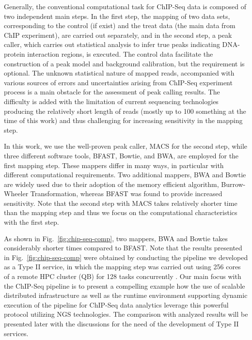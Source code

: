 \documentclass{cpeauth}
\begin{document}
 Generally, the conventional computational task for ChIP-Seq data is composed of two
 independent main steps\cite{pepke2009}.  In the first step,
 the mapping of two data sets, corresponding to the control (if exist) and the
 treat data (the main data from ChIP experiment), are carried out separately, and in the second step, a
 peak caller, which carries out statistical analysis to infer true
 peaks indicating DNA-protein interaction regions, is executed.  The
 control data facilitate the construction of a peak model and
 background calibration, but the requirement is optional.  The unknown statistical
 nature of mapped reads, accompanied with various sources of errors and uncertainties arising from ChIP-Seq
 experiment process is a main obstacle for the assessment of peak calling results.  The difficulty is added with the limitation of current sequencing technologies producing the relatively short length of reads
 (mostly up to 100 something at the time of this work) and thus challenging for increasing
 sensitivity in the mapping step\cite{pepke2009,laajala,wilbanks}.
 
 In this work, we use the well-proven peak caller, MACS\cite{macs} for
 the second step, while three different software tools, BFAST, Bowtie,
 and BWA, are employed for the first mapping step.  These mappers
 differ in many ways, in particular with different computational
 requirements.  Two additional mappers, BWA and Bowtie are widely used
 due to their adoption of the memory efficient algorithm,
 Burrow-Wheeler Transformation, whereas BFAST was found to provide
 increased sensitivity\cite{bfast2009,mapping-survey}.  Note that the second step with MACS takes relatively shorter time than the mapping step and thus we focus on the computational characteristics with the first step.  
 
 As shown in Fig.~\ref{fig:chip-seq-comp}, two mappers, BWA and Bowtie takes
 considerably shorter times compared to BFAST.  Note that the results
 presented in Fig.~\ref{fig:chip-seq-comp} were obtained by conducting
 the pipeline we developed as a Type II service, in which the mapping step was carried out using
 256 cores of a remote HPC cluster (QB) for 128 tasks concurrently .  Our main focus with the
 ChIP-Seq pipeline is to present a compelling example how the use of
 scalable distributed infrastructure as well as the runtime
 environment supporting dynamic execution of the pipeline for ChIP-Seq
 data analytics leverage this powerful protocol utilizing NGS
 technologies.  The comparison with analyzed results will be presented later with the discussions for the need of the development of Type II services. 
\end{document}
